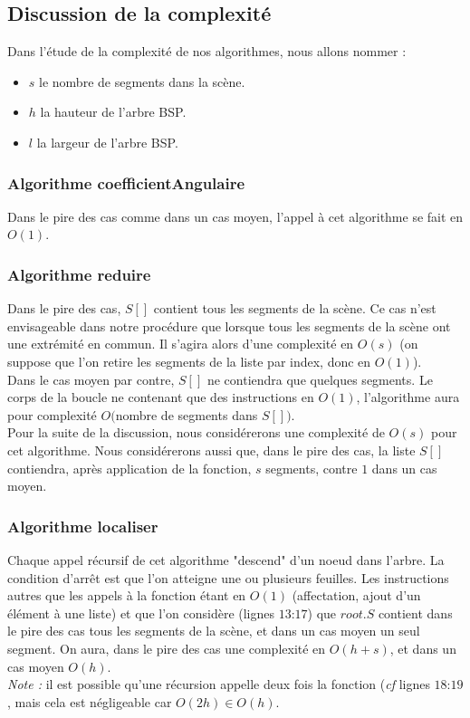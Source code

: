 \documentclass[10pt]{article}
\begin{document}
\newpage
\subsection{Discussion de la complexité}
Dans l'étude de la complexité de nos algorithmes, nous allons nommer :
\begin{itemize}
\item $s$ le nombre de segments dans la scène.
\item $h$ la hauteur de l'arbre BSP.
\item $l$ la largeur de l'arbre BSP.
\end{itemize}
\subsubsection{Algorithme coefficientAngulaire}
Dans le pire des cas comme dans un cas moyen, l'appel à cet algorithme se fait en $O(1)$.
\subsubsection{Algorithme reduire}
Dans le pire des cas, $S[]$ contient tous les segments de la scène. Ce cas n'est envisageable dans notre procédure que lorsque tous les segments de la scène ont une extrémité en commun. Il s'agira alors d'une complexité en $O(s)$ (on suppose que l'on retire les segments de la liste par index, donc en $O(1)$).\\[.5cm]
Dans le cas moyen par contre, $S[]$ ne contiendra que quelques segments. Le corps de la boucle ne contenant que des instructions en $O(1)$, l'algorithme aura pour complexité $O($nombre de segments dans $S[])$.\\[.5cm]
Pour la suite de la discussion, nous considérerons une complexité de $O(s)$ pour cet algorithme. Nous considérerons aussi que, dans le pire des cas, la liste $S[]$ contiendra, après application de la fonction, $s$ segments, contre $1$ dans un cas moyen.
\subsubsection{Algorithme localiser}
Chaque appel récursif de cet algorithme "descend" d'un noeud dans l'arbre. La condition d'arrêt est que l'on atteigne une ou plusieurs feuilles. Les instructions autres que les appels à la fonction étant en $O(1)$ (affectation, ajout d'un élément à une liste) et que l'on considère (lignes $13$:$17$) que $root.S$ contient dans le pire des cas tous les segments de la scène, et dans un cas moyen un seul segment. On aura, dans le pire des cas une complexité en $O(h+s)$, et dans un cas moyen $O(h)$.\\[.5cm]
\emph{Note : }il est possible qu'une récursion appelle deux fois la fonction (\emph{cf} lignes $18$:$19$, mais cela est négligeable car $O(2h)\in O(h)$.
\end{document}
